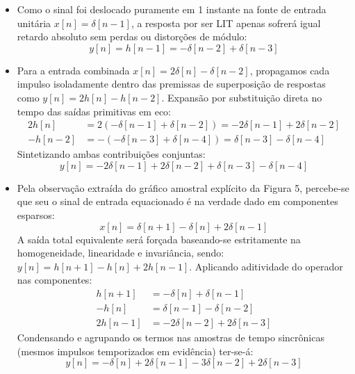 \documentclass[tcc]{classe_uftex/uftex}
\begin{document}
\begin{itemize}
    \item[\textbf{a)}] Como o sinal foi deslocado puramente em 1 instante na fonte de entrada unitária $x[n] = \delta[n-1]$, a resposta por ser LIT apenas sofrerá igual retardo absoluto sem perdas ou distorções de módulo:
    \begin{equation}
        y[n] = h[n-1] = -\delta[n-2] + \delta[n-3]
    \end{equation}

    \item[\textbf{b)}] Para a entrada combinada $x[n] = 2\delta[n] - \delta[n-2]$, propagamos cada impulso isoladamente dentro das premissas de superposição de respostas como $y[n] = 2h[n] - h[n-2]$. Expansão por substituição direta no tempo das saídas primitivas em eco:
    \begin{align*}
        2h[n] &= 2(-\delta[n-1] + \delta[n-2]) = -2\delta[n-1] + 2\delta[n-2] \\
        -h[n-2] &= -(-\delta[n-3] + \delta[n-4]) = \delta[n-3] - \delta[n-4]
    \end{align*}
    Sintetizando ambas contribuições conjuntas:
    \begin{equation}
        y[n] = -2\delta[n-1] + 2\delta[n-2] + \delta[n-3] - \delta[n-4]
    \end{equation}

    \item[\textbf{c)}] Pela observação extraída do gráfico amostral explícito da Figura 5, percebe-se que seu o sinal de entrada equacionado é na verdade dado em componentes esparsos:
    \begin{equation}
        x[n] = \delta[n+1] - \delta[n] + 2\delta[n-1]
    \end{equation}
    A saída total equivalente será forçada baseando-se estritamente na homogeneidade, linearidade e invariância, sendo: $y[n] = h[n+1] - h[n] + 2h[n-1]$. Aplicando aditividade do operador nas componentes:
    \begin{align*}
        h[n+1] &= -\delta[n] + \delta[n-1] \\
        -h[n] &= \delta[n-1] - \delta[n-2] \\
        2h[n-1] &= -2\delta[n-2] + 2\delta[n-3]
    \end{align*}
    Condensando e agrupando os termos nas amostras de tempo sincrônicas (mesmos impulsos temporizados em evidência) ter-se-á:
    \begin{equation}
        y[n] = -\delta[n] + 2\delta[n-1] - 3\delta[n-2] + 2\delta[n-3]
    \end{equation}
\end{itemize}
\end{document}

